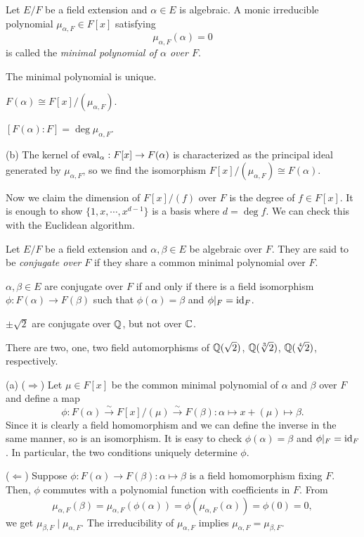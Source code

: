 \documentclass{../note}
\begin{document}
\begin{prb}
Let $E/F$ be a field extension and $\alpha\in E$ is algebraic.
A monic irreducible polynomial $\mu_{\alpha,F}\in F[x]$ satisfying 
\[\mu_{\alpha,F}(\alpha)=0\]
is called the \emph{minimal polynomial of $\alpha$ over $F$}.
\begin{parts}
\item The minimal polynomial is unique.
\item $F(\alpha)\cong F[x]/(\mu_{\alpha,F})$.
\item $[F(\alpha):F]=\deg\mu_{\alpha,F}$.
\end{parts}
\end{prb}
\begin{pf}
(b)
The kernel of $\operatorname{eval}_\alpha:F[x]\to F(\alpha)$ is characterized as the principal ideal generated by $\mu_{\alpha,F}$, so we find the isomorphism $F[x]/(\mu_{\alpha,F})\cong F(\alpha)$.

Now we claim the dimension of $F[x]/(f)$ over $F$ is the degree of $f\in F[x]$.
It is enough to show $\{1,x,\cdots,x^{d-1}\}$ is a basis where $d=\deg f$.
We can check this with the Euclidean algorithm.
\end{pf}



\begin{prb}
Let $E/F$ be a field extension and $\alpha,\beta\in E$ be algebraic over $F$.
They are said to be \emph{conjugate over $F$} if they share a common minimal polynomial over $F$.
\begin{parts}
\item $\alpha,\beta\in E$ are conjugate over $F$ if and only if there is a field isomorphism $\phi:F(\alpha)\to F(\beta)$ such that $\phi(\alpha)=\beta$ and $\phi|_F=\operatorname{id}_F$.
\item $\pm\sqrt2$ are conjugate over $\mathbb{Q}$, but not over $\mathbb{C}$.
\item There are two, one, two field automorphisms of $\mathbb{Q}(\sqrt2)$, $\mathbb{Q}(\sqrt[3]2)$, $\mathbb{Q}(\sqrt[4]2)$, respectively.
\end{parts}
\end{prb}
\begin{pf}
(a)
($\Rightarrow$)
Let $\mu\in F[x]$ be the common minimal polynomial of $\alpha$ and $\beta$ over $F$ and define a map
\[\phi:F(\alpha)\stackrel\sim\to F[x]/(\mu)\stackrel\sim\to F(\beta):\alpha\mapsto x+(\mu)\mapsto\beta.\]
Since it is clearly a field homomorphism and we can define the inverse in the same manner, so is an isomorphism.
It is easy to check $\phi(\alpha)=\beta$ and $\phi|_F=\operatorname{id}_F$.
In particular, the two conditions uniquely determine $\phi$.

($\Leftarrow$)
Suppose $\phi:F(\alpha)\to F(\beta):\alpha\mapsto\beta$ is a field homomorphism fixing $F$.
Then, $\phi$ commutes with a polynomial function with coefficients in $F$.
From
\[\mu_{\alpha,F}(\beta)=\mu_{\alpha,F}(\phi(\alpha))=\phi(\mu_{\alpha,F}(\alpha))=\phi(0)=0,\]
we get $\mu_{\beta,F}\mid\mu_{\alpha,F}$.
The irreducibility of $\mu_{\alpha,F}$ implies $\mu_{\alpha,F}=\mu_{\beta,F}$.
\end{pf}
\end{document}
